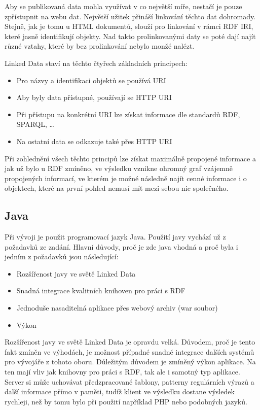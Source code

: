 \documentclass[thesis=B,czech]{FITthesis}[2012/06/26]
\begin{document}
  Aby se publikovaná data mohla využívat v co největší míře, nestačí je pouze zpřístupnit na webu dat. Největší užitek přináší linkování těchto dat dohromady.
  Stejně, jak je tomu u HTML dokumentů, slouží pro linkování v rámci RDF IRI, které jasně identifikují objekty. Nad takto prolinkovanými daty se poté dají
  najít různé vztahy, které by bez prolinkování nebylo monžé nalézt.
  
  Linked Data staví na těchto čtyřech základních principech:
  \begin{itemize}
   \item Pro názvy a identifikaci objektů se používá URI
   \item Aby byly data přístupné, používají se HTTP URI
   \item Při přístupu na konkrétní URI lze získat informace dle standardů RDF, SPARQL, \ldots
   \item Na ostatní data se odkazuje také přes HTTP URI
  \end{itemize}
  
  Při zohlednění všech těchto principů lze získat maximálně propojené informace a jak už bylo u RDF zmíněno, ve výsledku vznikne ohromný graf vzájemně
  propojených informací, ve kterém je možné následně najít cenné informace i o objektech, které na první pohled nemusí mít mezi sebou nic společného.

  
  \subsection{Java}
   Při vývoji je použit programovací jazyk Java. Použití javy vychází už z požadavků ze zadání. Hlavní důvody, proč je zde java vhodná a proč byla
   i jedním z požadavků jsou následující:
   \begin{itemize}
    \item Rozšířenost javy ve světě Linked Data
    \item Snadná integrace kvalitních knihoven pro práci s RDF
    \item Jednoduše nasaditelná aplikace přes webový archiv (war soubor)
    \item Výkon
   \end{itemize}
   Rozšířenost javy ve světě Linked Data je opravdu velká. Důvodem, proč je tento fakt zmíněn ve výhodách, je možnost případné snadné integrace dalších systémů
   pro vývojáře z tohoto oboru. Důležitým důvodem je zmíněný výkon aplikace. Na ten mají vliv jak knihovny pro práci s RDF, tak ale i samotný typ aplikace.
   Server si může uchovávat předzpracované šablony, patterny regulárních výrazů a další informace přímo v paměti, tudíž klient ve výsledku dostane výsledek rychleji,
   než by tomu bylo při použití například PHP nebo podobných jazyků.
   
\end{document}
